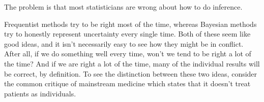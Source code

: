 \documentclass[a4paper, 11pt]{article}
\begin{document}
The problem is that most statisticians are wrong about how to do inference.

Frequentist methods try to be right most of the time, whereas Bayesian methods
try to honestly represent uncertainty every single time. Both of these seem
like good ideas, and it isn't necessarily easy to see how they might be in
conflict. After all, if we do something well every time, won't we tend to be
right a lot of the time? And if we are right a lot of the time, many of the
individual results will be correct, by definition.
To see the distinction between these two ideas,
consider the common critique of mainstream medicine which states that it
doesn't treat patients as individuals.
\end{document}
